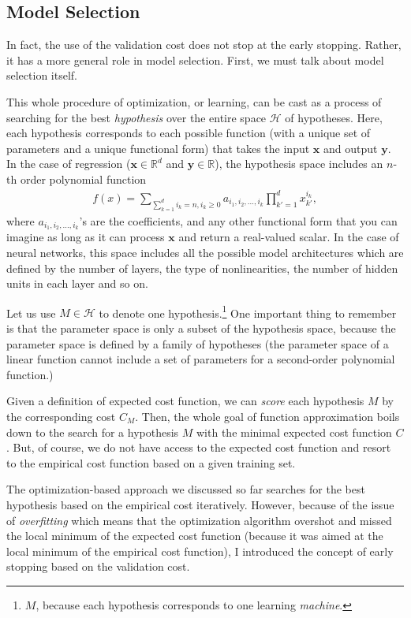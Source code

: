\documentclass{report}
\newcommand{\vect}[1]{\mathbf{#1}}
\newcommand{\vx}[0]{\vect{x}}
\newcommand{\vy}[0]{\vect{y}}
\newcommand{\HH}[0]{\mathcal{H}}
\newcommand{\RR}[0]{\mathbb{R}}
\begin{document}
\subsection{Model Selection}
\label{sec:hypothesis_space}

In fact, the use of the validation cost does not stop at the early stopping.
Rather, it has a more general role in model selection. First, we must talk about
model selection itself.

This whole procedure of optimization, or learning, can be cast as a process of
searching for the best {\em hypothesis} over the entire space $\HH$ of
hypotheses.  Here, each hypothesis corresponds to each possible function (with a
unique set of parameters and a unique functional form) that takes the input
$\vx$ and output $\vy$. In the case of regression ($\vx \in \RR^d$ and $\vy \in
\RR$), the hypothesis space includes an $n$-th order polynomial function 
\begin{align*}
    f(x) = \sum_{\sum_{k=1}^d i_k = n, i_k \geq 0}
    a_{i_1,i_2,\ldots,i_k} \prod_{k'=1}^d x_{k'}^{i_k},
\end{align*}
where $a_{i_1,i_2,\ldots,i_k}$'s are the coefficients, and 
any other functional form that you can imagine as long as it can process $\vx$
and return a real-valued scalar.  In the case of neural networks, this space
includes all the possible model architectures which are defined by the number of
layers, the type of nonlinearities, the number of hidden units in each layer and
so on. 

Let us use
$M \in \HH$ to denote one hypothesis.\footnote{
    $M$, because each hypothesis corresponds to one learning {\em machine}.
} One important thing to remember is that the parameter space is only a subset
of the hypothesis space, because the parameter space is defined by a family of
hypotheses (the parameter space of a linear function cannot include a set of
parameters for a second-order polynomial function.)

Given a definition of expected cost function, we can {\em score} each hypothesis
$M$ by the corresponding cost $C_M$. Then, the whole goal of function
approximation boils down to the search for a hypothesis $M$ with the minimal
expected cost function $C$. But, of course, we do not have access to the
expected cost function and resort to the empirical cost function based on a
given training set. 

The optimization-based approach we discussed so far searches for the best
hypothesis based on the empirical cost iteratively. However, because of the
issue of {\em overfitting} which means that the optimization algorithm overshot
and missed the local minimum of the expected cost function (because it was aimed
at the local minimum of the empirical cost function), I introduced the concept
of early stopping based on the validation cost.
\end{document}
